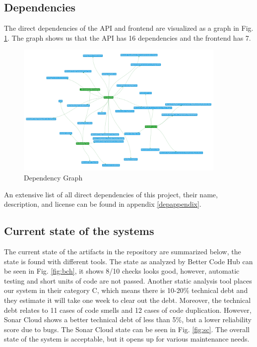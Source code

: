 \documentclass[10pt]{article}
\begin{document}
\subsection{Dependencies}
The direct dependencies of the API and frontend are visualized as a graph in Fig. \ref{fig:depgrapg}. The graph shows us that the API has 16 dependencies and the frontend has 7.
\begin{figure} [H]
  \centering
  \includegraphics[width=0.9\textwidth]{images/dependencygraph.png}
  \caption{Dependency Graph}
  \label{fig:depgrapg}
\end{figure}

An extensive list of all direct dependencies of this project, their name, description, and license can be found in appendix \ref{depappendix}.


\subsection{Current state of the systems}
The current state of the artifacts in the repository are summarized below, the state is found with different tools.
The state as analyzed by Better Code Hub can be seen in Fig. \ref{fig:bch}, it shows 8/10 checks looks good, however, automatic testing and short units of code are not passed. Another static analysis tool places our system in their category C, which means there is 10-20\% technical debt and they estimate it will take one week to clear out the debt. Moreover, the technical debt relates to 11 cases of code smells and 12 cases of code duplication. However, Sonar Cloud shows a better technical debt of less than 5\%, but a lower reliability score due to bugs. The Sonar Cloud state can be seen in Fig. \ref{fig:sc}. The overall state of the system is acceptable, but it opens up for various maintenance needs.
\end{document}
